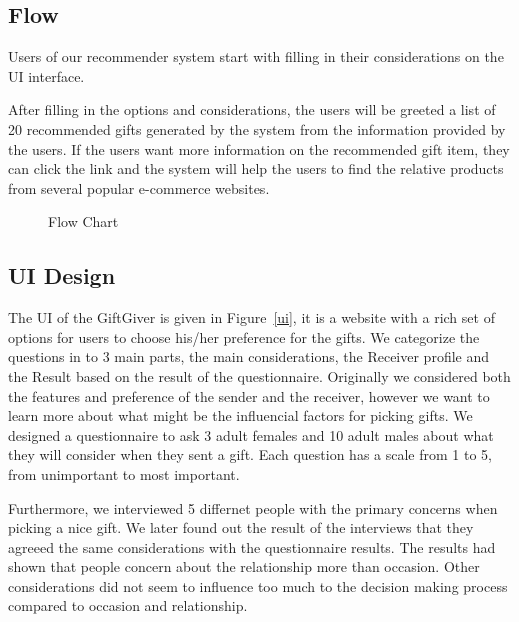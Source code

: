 \documentclass[11pt,twocolumn]{article}
\begin{document}
\subsection{Flow}
Users of our recommender system start with filling in their considerations on the UI interface.    

After filling in the options and considerations, the users will be greeted  a list of 20 recommended gifts generated by the system from the information provided by the users.
If the users want more information on the recommended gift item, they can click the link and the system will help the users to find the relative products from several popular e-commerce websites.

\begin{figure}[h!t]
\caption{Flow Chart}
\end{figure}


\subsection{UI Design}
The UI of the GiftGiver is given in Figure~\ref{ui}, it is a website with a rich set of options for users to choose his/her preference for the gifts. We categorize the questions in to 3 main parts, the main considerations, the Receiver profile and the Result based on the result of the questionnaire. Originally we considered both the features and preference of the sender and the receiver, however we want to learn more about what might be the influencial factors for picking gifts.  We designed a questionnaire to ask 3 adult females and 10 adult males about what they will consider when they sent a gift. Each question has a scale from 1 to 5, from unimportant to most important.

Furthermore, we interviewed 5 differnet people with the primary concerns when picking a nice gift. We later found out the result of the interviews that they agreeed the same considerations with the questionnaire results. The results had shown that people  concern about the relationship more than occasion.  Other considerations did not seem to influence too much to the decision making process compared to occasion and relationship.
\end{document}
